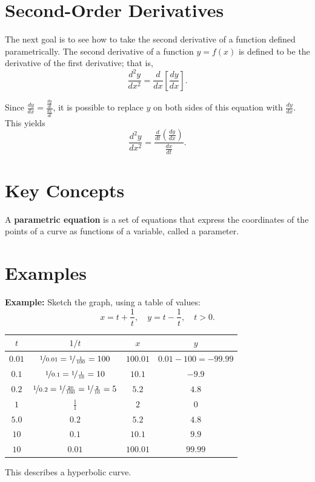 \documentclass{article}
\begin{document}
\section*{Second-Order Derivatives}
\begin{theorembox}
The next goal is to see how to take the second derivative of a function defined parametrically. The second derivative of a function \( y = f(x) \) is defined to be the derivative of the first derivative; that is,  
\[
\frac{d^2y}{dx^2} = \frac{d}{dx} \left[ \frac{dy}{dx} \right].
\]  

Since \( \frac{dy}{dx} = \frac{\frac{dy}{dt}}{\frac{dx}{dt}} \), it is possible to replace \( y \) on both sides of this equation with \( \frac{dy}{dx} \). This yields
\[
\frac{d^2y}{dx^2} = \frac{\frac{d}{dt}\left( \frac{dy}{dx} \right)}{\frac{dx}{dt}}.
\]
\end{theorembox}



\section*{Key Concepts}
\begin{definitionbox}
A \textbf{parametric equation} is a set of equations that express the coordinates of the points of a curve as functions of a variable, called a parameter.
\end{definitionbox}

\section*{Examples}
\begin{examplebox}
\textbf{Example:} Sketch the graph, using a table of values:
\[ x = t + \frac{1}{t}, \quad y = t - \frac{1}{t}, \quad t > 0. \]

\begin{center}
\begin{adjustbox}{max width=\textwidth}
\LARGE
\begin{tabular}{|c|c|c|c|}
\hline
$t$    & $1/t$ & $x$ & $y$ \\ \hline
$0.01$ & $\nicefrac{1}{0.01} = \nicefrac{1}{\frac{1}{100}} = 100$     & $100.01$   & $0.01 - 100 = -99.99$   \\ \hline
$0.1$  & $\nicefrac{1}{0.1} = \nicefrac{1}{\frac{1}{10}} = 10$     & $10.1$   & $-9.9$   \\ \hline
$0.2$  & $\nicefrac{1}{0.2} = \nicefrac{1}{\frac{20}{100}} = \nicefrac{1}{\frac{2}{10}} = 5$     & $5.2$   & $4.8$   \\ \hline
$1$    & $\frac{1}{1}$     & $2$   & $0$   \\ \hline
$5.0$  & $0.2$     & $5.2$   & $4.8$   \\ \hline
$10$   & $0.1$     & $10.1$   & $9.9$   \\ \hline
$10$   & $0.01$    & $100.01$   & $99.99$   \\ \hline
\end{tabular}
\normalsize
\end{adjustbox}
\end{center}

This describes a hyperbolic curve.
\end{examplebox}
\end{document}
